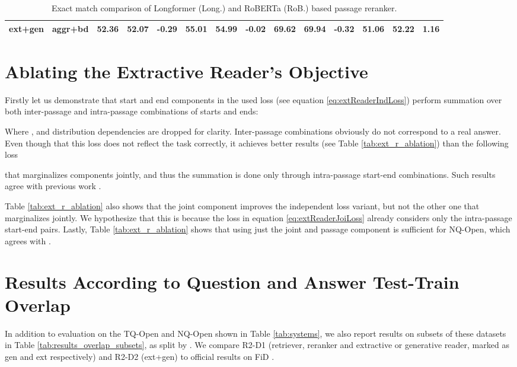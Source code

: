 \documentclass[11pt]{article}
\begin{document}
\begin{table*}
{\begin{tabular}{cc|rrr|rrr|rrr|rrr}
ext+gen                           & aggr+bd                          & 52.36 & 52.07                    & -0.29                         & 55.01                     & 54.99                    & -0.02                         & 69.62                     & 69.94                    & -0.32                         & 51.06                     & 52.22                    & 1.16                         \\ \bottomrule
\end{tabular} }
\caption{Exact match comparison of Longformer (Long.) and RoBERTa (RoB.) based passage reranker.}
    \label{tab:old_ablation_study}
\end{table*}

\section{Ablating the Extractive Reader's Objective} \label{app:ext_r_ablations}

Firstly let us demonstrate that start and end components in the used loss (see equation \ref{eq:extReaderIndLoss}) perform summation over both inter-passage and intra-passage combinations of starts and ends:


Where ,  and distribution dependencies are dropped for clarity.
Inter-passage combinations obviously do not correspond to a real answer. Even though that this loss does not reflect the task correctly, it achieves better results (see Table \ref{tab:ext_r_ablation}) than the following loss 



that marginalizes components jointly, and thus the summation is done only through intra-passage start-end combinations. Such results agree with previous work \cite{cheng-etal-2020-probabilistic}.

Table \ref{tab:ext_r_ablation} also shows that the joint component improves the independent loss variant, but not the other one that marginalizes jointly. We hypothesize that this is because the loss in equation \ref{eq:extReaderJoiLoss} already considers only the intra-passage start-end pairs. Lastly, Table \ref{tab:ext_r_ablation} shows that using just the joint and passage component is sufficient for NQ-Open, which agrees with \citet{fajcik2020rethinking}. 



\section{Results According to Question and Answer Test-Train Overlap}
\label{app:train_test_overlap}
In addition to evaluation on the TQ-Open and NQ-Open shown in Table \ref{tab:systems}, we also report results on subsets of these datasets in Table \ref{tab:results_overlap_subsets}, as split by \citet{lewis-etal-2021-question}. We compare  R2-D1 (retriever, reranker and extractive or generative reader, marked as gen and ext respectively) and R2-D2 (ext+gen) to official results on FiD \cite{izacard2020leveraging}.
\end{document}
